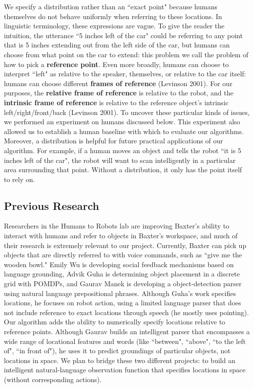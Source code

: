 \documentclass[12pt,letterpaper]{article}
\newcommand\tab[1][1cm]{\hspace*{#1}}
\begin{document}
We specify a distribution rather than an ``exact point" because humans themselves do not behave uniformly when referring to these locations. In linguistic terminology, these expressions are vague. To give the reader the intuition, the utterance ``5 inches left of the car" could be referring to any point that is 5 inches extending out from the left side of the car, but humans can choose from what point on the car to extend: this problem we call the problem of how to pick a \textbf{reference point}. Even more broadly, humans can choose to interpret ``left" as relative to the speaker, themselves, or relative to the car itself: humans can choose different \textbf{frames of reference} (Levinson 2001). For our purposes, the \textbf{relative frame of reference} is relative to the robot, and the \textbf{intrinsic frame of reference} is relative to the reference object's intrinsic left/right/front/back (Levinson 2001). To uncover these particular kinds of issues, we performed an experiment on humans discussed below. This experiment also allowed us to establish a human baseline with which to evaluate our algorithms.\\
\tab Moreover, a distribution is helpful for future practical applications of our algorithm. For example, if a human moves an object and tells the robot ``it is 5 inches left of the car", the robot will want to scan intelligently in a particular area surrounding that point. Without a distribution, it only has the point itself to rely on. 

\subsection{Previous Research}

\tab Researchers in the Humans to Robots lab are improving Baxter's ability to interact with humans and refer to objects in Baxter's workspace, and much of their research is extremely relevant to our project. Currently, Baxter can pick up objects that are directly referred to with voice commands, such as ``give me the wooden bowl."  Emily Wu is developing social feedback mechanisms based on language grounding, Advik Guha is determining object placement in a discrete grid with POMDPs, and Gaurav Manek is developing a object-detection parser using natural language prepositional phrases. Although Guha's work specifies locations, he focuses on robot action, using a limited language parser that does not include reference to exact locations through speech (he mostly uses pointing). Our algorithm adds the ability to numerically specify locations relative to reference points. Although Gaurav builds an intelligent parser that encompasses a wide range of locational features and words (like ``between", ``above", ``to the left of", ``in front of"), he uses it to predict groundings of particular objects, not locations in space. We plan to bridge these two different projects: to build an intelligent natural-language observation function that specifies locations in space (without corresponding actions).
\end{document}
